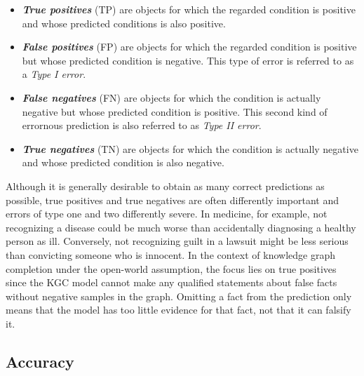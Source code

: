 \begin{itemize}
    \item \textbf{\emph{True positives}} (TP) are objects for which the regarded condition is positive and whose predicted conditions is also positive.

    \item \textbf{\emph{False positives}} (FP) are objects for which the regarded condition is positive but whose predicted condition is negative. This type of error is referred to as a \emph{Type I error}.

    \item \textbf{\emph{False negatives}} (FN) are objects for which the condition is actually negative but whose predicted condition is positive. This second kind of errornous prediction is also referred to as \emph{Type II error}.

    \item \textbf{\emph{True negatives}} (TN) are objects for which the condition is actually negative and whose predicted condition is also negative.
\end{itemize}

Although it is generally desirable to obtain as many correct predictions as possible, true positives and true negatives are often differently important and errors of type one and two differently severe. In medicine, for example, not recognizing a disease could be much worse than accidentally diagnosing a healthy person as ill. Conversely, not recognizing guilt in a lawsuit might be less serious than convicting someone who is innocent. In the context of knowledge graph completion under the open-world assumption, the focus lies on true positives since the KGC model cannot make any qualified statements about false facts without negative samples in the graph. Omitting a fact from the prediction only means that the model has too little evidence for that fact, not that it can falsify it.


\subsection{Accuracy}
\label{subsec:2_basics/2_metrics/1_accuracy}



